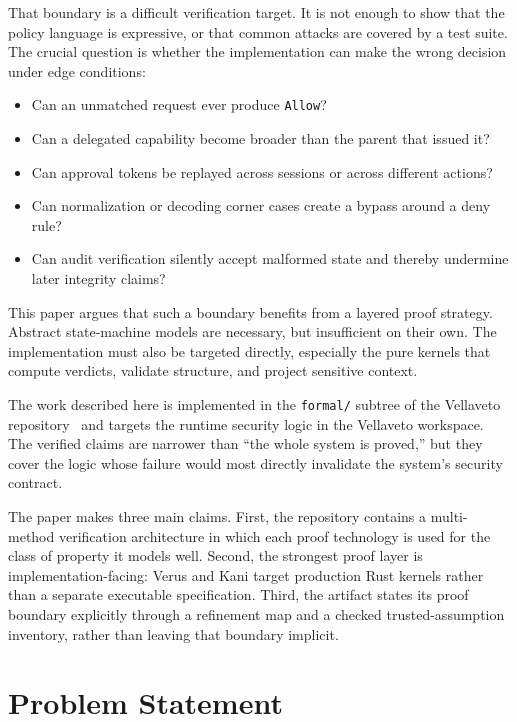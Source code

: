 \documentclass[11pt]{article}
\begin{document}
That boundary is a difficult verification target. It is not enough to show that
the policy language is expressive, or that common attacks are covered by a test
suite. The crucial question is whether the implementation can make the wrong
decision under edge conditions:

\begin{itemize}[leftmargin=*]
\item Can an unmatched request ever produce \texttt{Allow}?
\item Can a delegated capability become broader than the parent that issued it?
\item Can approval tokens be replayed across sessions or across different actions?
\item Can normalization or decoding corner cases create a bypass around a deny rule?
\item Can audit verification silently accept malformed state and thereby
undermine later integrity claims?
\end{itemize}

This paper argues that such a boundary benefits from a layered proof strategy.
Abstract state-machine models are necessary, but insufficient on their own. The
implementation must also be targeted directly, especially the pure kernels that
compute verdicts, validate structure, and project sensitive context.

The work described here is implemented in the \texttt{formal/} subtree of the
Vellaveto repository~\cite{vellavetoFormalInventory} and targets the runtime
security logic in the Vellaveto workspace. The verified claims are narrower
than ``the whole system is proved,'' but they cover the logic whose failure
would most directly invalidate the system's security contract.

The paper makes three main claims. First, the repository contains a
multi-method verification architecture in which each proof technology is used
for the class of property it models well. Second, the strongest proof layer is
implementation-facing: Verus and Kani target production Rust kernels rather
than a separate executable specification. Third, the artifact states its proof
boundary explicitly through a refinement map and a checked trusted-assumption
inventory, rather than leaving that boundary implicit.

\section{Problem Statement}
\end{document}
